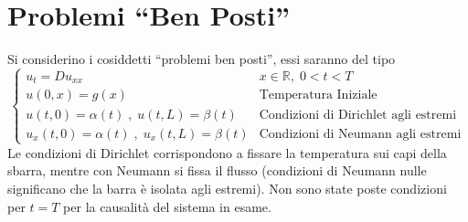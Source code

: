 \section{Problemi ``Ben Posti''}
Si considerino i cosiddetti ``problemi ben posti'', essi saranno del tipo
\[
	\left\{
	\begin{array}{ll}
		u_t=Du_{xx} & x\in\mathbb{R}, \; 0<t<T \\
		u(0,x)=g(x) & \text{Temperatura Iniziale}\\
		u(t,0)=\alpha(t) \; , \; u(t,L)=\beta(t) & \text{Condizioni di
Dirichlet agli estremi}\\
		u_x(t,0)=\alpha(t) \; , \; u_x(t,L)=\beta(t) & \text{Condizioni
di Neumann agli estremi}
	\end{array}
	\right.
\]
Le condizioni di Dirichlet corrispondono a fissare la temperatura sui capi della
sbarra, mentre con Neumann si fissa
il flusso (condizioni di Neumann nulle significano che la barra \`e isolata agli
estremi). Non sono state poste condizioni per $t=T$
per la causalit\`a del sistema in esame.

